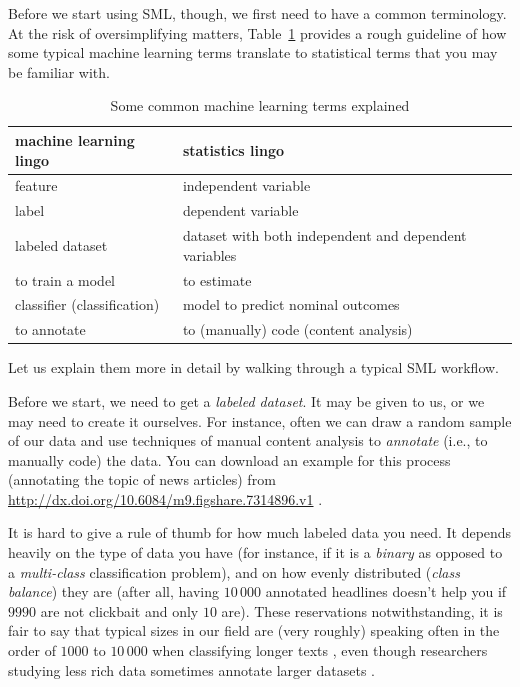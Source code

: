 Before we start using SML, though, we first need to have
a common terminology.
At the risk of oversimplifying matters, Table~\ref{tab:mllingo} provides a rough
guideline of how some typical machine learning terms translate to statistical
terms that you may be familiar with.

\begin{table}
\caption{\label{tab:mllingo}Some common machine learning terms explained}{
  \centering
\begin{tabularx}{\textwidth}{XX}
\toprule
machine learning lingo  & statistics lingo\\
\midrule
feature                 & independent variable  \\
label                   & dependent variable  \\
labeled dataset         & dataset with both independent and dependent variables\\
to train a model        & to estimate \\
classifier (classification)  & model to predict nominal outcomes \\
to annotate             & to (manually) code (content analysis) \\
\bottomrule
\end{tabularx}}{}
\end{table}

Let us explain them more in detail by walking through a typical SML workflow.

Before we start, we need to get a \emph{labeled dataset}.
It may be given to us, or we may need to create it ourselves.
For instance, often we can draw a random sample of our data and use techniques
of manual content analysis \citep[e.g.,][]{riffe2019analyzing} to
\emph{annotate} (i.e., to manually code) the data.
You can download an example for this process (annotating the topic of news
articles) from \url{http://dx.doi.org/10.6084/m9.figshare.7314896.v1} \citep{Vermeer2018}.

It is hard to give a rule of thumb for how much labeled data you need.
It depends heavily on the type of data you have (for instance, if it is a \emph{binary} as opposed to a \emph{multi-class} classification problem), and on how evenly distributed (\emph{class balance}) they are (after all, having $10\,000$ annotated headlines doesn't help you if $9990$ are not clickbait and only $10$ are).
These reservations notwithstanding, it is fair to say that typical sizes in
our field are (very roughly) speaking often in the order of $1000$ to $10\,000$
when classifying longer texts \citep[see][]{Burscher2014},
even though researchers studying less rich data sometimes annotate larger
datasets \citep[e.g., $60\,000$ social media messages in][]{vermeer2019seeing}.

